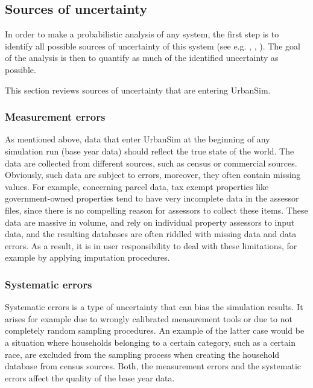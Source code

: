 \documentclass[11pt, fleqn]{article}
\begin{document}
\subsection{Sources of uncertainty}
%
In order to make a probabilistic analysis of any system, the first step is to
identify all possible sources of uncertainty of this system (see e.g.
\citet{morgan90}, \citet{dubus03}, \citet{regan03}). The goal of the analysis
is then to quantify as much of the identified uncertainty as possible.

This section reviews sources of uncertainty that are entering UrbanSim.

\subsubsection{Measurement errors}
%
As mentioned above, data that enter UrbanSim at the beginning of any
simulation run (base year data) should reflect the true state of the world.
The data are collected from different sources, such as census or commercial
sources. Obviously, such data are subject to errors, moreover, they often
contain missing values. For example, concerning parcel data, tax exempt
properties like government-owned properties tend to have very incomplete data
in the assessor files, since there is no compelling reason for assessors to
collect these items.  These data are massive in volume, and rely on individual
property assessors to input data, and the resulting databases are often
riddled with missing data and data errors. As a result, it is in user
responsibility to deal with these limitations, for example by applying
imputation procedures. 

\subsubsection{Systematic errors}
%
Systematic errors is a type of uncertainty that can bias the simulation
results. It arises for example due to wrongly calibrated measurement tools or
due to not completely random sampling procedures. An example of the latter
case would be a situation where households belonging to a certain category,
such as a certain race, are excluded from the sampling process when creating
the household database from census sources. Both, the measurement errors and
the systematic errors affect the quality of the base year data.
\end{document}

